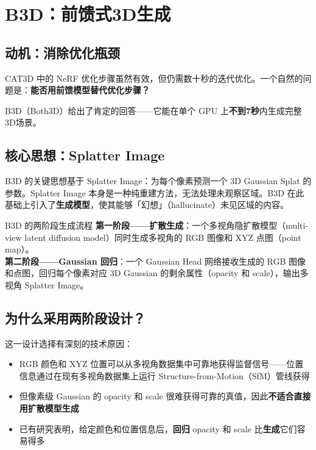 \section{B3D：前馈式3D生成}

\subsection{动机：消除优化瓶颈}

CAT3D 中的 NeRF 优化步骤虽然有效，但仍需数十秒的迭代优化。一个自然的问题是：\textbf{能否用前馈模型替代优化步骤？}

B3D（Both3D）给出了肯定的回答——它能在单个 GPU 上\textbf{不到7秒}内生成完整3D场景。

\subsection{核心思想：Splatter Image}

B3D 的关键思想基于 Splatter Image：为每个像素预测一个 3D Gaussian Splat 的参数。Splatter Image 本身是一种纯重建方法，无法处理未观察区域。B3D 在此基础上引入了\textbf{生成模型}，使其能够「幻想」（hallucinate）未见区域的内容。

\begin{importantbox}{B3D 的两阶段生成流程}
\textbf{第一阶段——扩散生成}：一个多视角隐扩散模型（multi-view latent diffusion model）同时生成多视角的 RGB 图像和 XYZ 点图（point map）。\\
\textbf{第二阶段——Gaussian 回归}：一个 Gaussian Head 网络接收生成的 RGB 图像和点图，回归每个像素对应 3D Gaussian 的剩余属性（opacity 和 scale），输出多视角 Splatter Image。
\end{importantbox}

\subsection{为什么采用两阶段设计？}

这一设计选择有深刻的技术原因：

\begin{itemize}
    \item RGB 颜色和 XYZ 位置可以从多视角数据集中可靠地获得监督信号——位置信息通过在现有多视角数据集上运行 Structure-from-Motion（SfM）管线获得
    \item 但像素级 Gaussian 的 opacity 和 scale 很难获得可靠的真值，因此\textbf{不适合直接用扩散模型生成}
    \item 已有研究表明，给定颜色和位置信息后，\textbf{回归} opacity 和 scale 比\textbf{生成}它们容易得多
\end{itemize}


